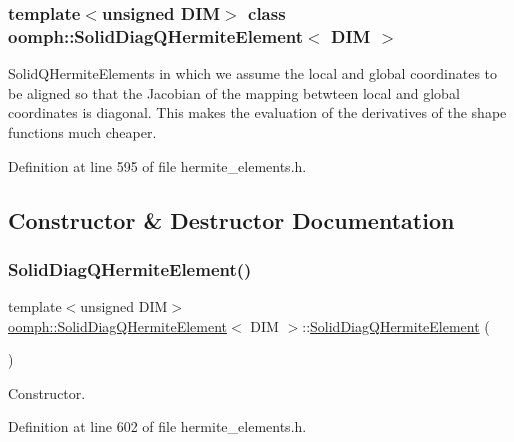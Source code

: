 \subsubsection*{template$<$unsigned D\+IM$>$\newline
class oomph\+::\+Solid\+Diag\+Q\+Hermite\+Element$<$ D\+I\+M $>$}

Solid\+Q\+Hermite\+Elements in which we assume the local and global coordinates to be aligned so that the Jacobian of the mapping betwteen local and global coordinates is diagonal. This makes the evaluation of the derivatives of the shape functions much cheaper. 

Definition at line 595 of file hermite\+\_\+elements.\+h.



\subsection{Constructor \& Destructor Documentation}
\mbox{\label{classoomph_1_1SolidDiagQHermiteElement_a93bda1d179d2855ec13a0c42b27a51b7}} 
\subsubsection{\texorpdfstring{Solid\+Diag\+Q\+Hermite\+Element()}{SolidDiagQHermiteElement()}\hspace{0.1cm}{\footnotesize\ttfamily [1/2]}}
{\footnotesize\ttfamily template$<$unsigned D\+IM$>$ \\
\hyperlink{classoomph_1_1SolidDiagQHermiteElement}{oomph\+::\+Solid\+Diag\+Q\+Hermite\+Element}$<$ D\+IM $>$\+::\hyperlink{classoomph_1_1SolidDiagQHermiteElement}{Solid\+Diag\+Q\+Hermite\+Element} (\begin{DoxyParamCaption}{ }\end{DoxyParamCaption})\hspace{0.3cm}{\ttfamily [inline]}}



Constructor. 



Definition at line 602 of file hermite\+\_\+elements.\+h.

